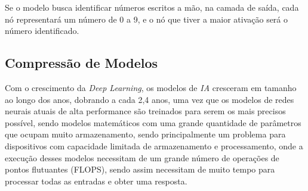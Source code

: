 Se o modelo busca identificar números escritos a mão, na camada de saída, cada nó representará um número de 0 a 9, e o nó que tiver a maior ativação será o número identificado.

\subsection{Compressão de Modelos}
Com o crescimento da \textit{Deep Learning}, os modelos de \textit{IA} cresceram em tamanho ao longo dos anos, dobrando a cada 2,4 anos,
uma vez que os modelos de redes neurais atuais de alta performance são treinados para serem os mais precisos possível, sendo modelos matemáticos com uma grande quantidade de parâmetros que ocupam muito armazenamento,
sendo principalmente um problema para dispositivos com capacidade limitada de armazenamento e processamento, onde a execução desses modelos necessitam de um grande número de operações de pontos flutuantes (FLOPS), sendo assim necessitam de muito tempo para processar todas as entradas e obter uma resposta.

